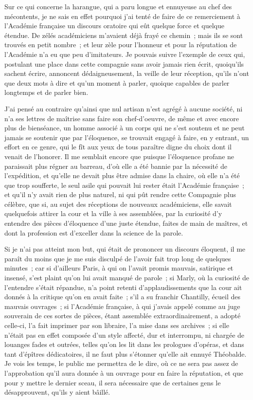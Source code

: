 \documentclass[french,twoside]{book} %
\begin{document}
Sur ce qui concerne la harangue, qui a paru longue et ennuyeuse au chef des mécontents, je ne sais en effet pourquoi j’ai tenté de faire de ce remerciement à l’Académie française un discours oratoire qui eût quelque force et quelque étendue. De zélés académiciens m’avaient déjà frayé ce chemin ; mais ils se sont trouvés en petit nombre ; et leur zèle pour l’honneur et pour la réputation de l’Académie n’a eu que peu d’imitateurs. Je pouvais suivre l’exemple de ceux qui, postulant une place dans cette compagnie sans avoir jamais rien écrit, quoiqu’ils sachent écrire, annoncent dédaigneusement, la veille de leur réception, qu’ils n’ont que deux mots à dire et qu’un moment à parler, quoique capables de parler longtemps et de parler bien.\par
J'ai pensé au contraire qu’ainsi que nul artisan n’est agrégé à aucune société, ni n’a ses lettres de maîtrise sans faire son chef-d’oeuvre, de même et avec encore plus de bienséance, un homme associé à un corps qui ne s’est soutenu et ne peut jamais se soutenir que par l’éloquence, se trouvait engagé à faire, en y entrant, un effort en ce genre, qui le fît aux yeux de tous paraître digne du choix dont il venait de l’honorer. Il me semblait encore que puisque l’éloquence profane ne paraissait plus régner au barreau, d’où elle a été bannie par la nécessité de l’expédition, et qu’elle ne devait plus être admise dans la chaire, où elle n’a été que trop soufferte, le seul asile qui pouvait lui rester était l’Académie française ; et qu’il n’y avait rien de plus naturel, ni qui pût rendre cette Compagnie plus célèbre, que si, au sujet des réceptions de nouveaux académiciens, elle savait quelquefois attirer la cour et la ville à ses assemblées, par la curiosité d’y entendre des pièces d’éloquence d’une juste étendue, faites de main de maîtres, et dont la profession est d’exceller dans la science de la parole.\par
Si je n’ai pas atteint mon but, qui était de prononcer un discours éloquent, il me paraît du moins que je me suis disculpé de l’avoir fait trop long de quelques minutes ; car si d’ailleurs Paris, à qui on l’avait promis mauvais, satirique et insensé, s’est plaint qu’on lui avait manqué de parole ; si Marly, où la curiosité de l’entendre s’était répandue, n’a point retenti d’applaudissements que la cour ait donnés à la critique qu’on en avait faite ; s’il a su franchir Chantilly, écueil des mauvais ouvrages ; si l’Académie française, à qui j’avais appelé comme au juge souverain de ces sortes de pièces, étant assemblée extraordinairement, a adopté celle-ci, l’a fait imprimer par son libraire, l’a mise dans ses archives ; si elle n’était pas en effet composée d’un style affecté, dur et interrompu, ni chargée de louanges fades et outrées, telles qu’on les lit dans les prologues d’opéras, et dans tant d’épîtres dédicatoires, il ne faut plus s’étonner qu’elle ait ennuyé Théobalde. Je vois les temps, le public me permettra de le dire, où ce ne sera pas assez de l’approbation qu’il aura donnée à un ouvrage pour en faire la réputation, et que pour y mettre le dernier sceau, il sera nécessaire que de certaines gens le désapprouvent, qu’ils y aient bâillé.\par
\end{document}

